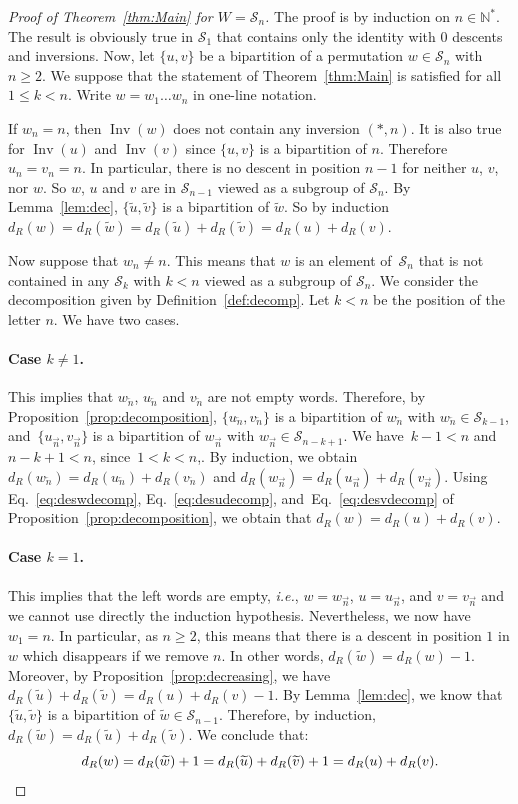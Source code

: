 \documentclass[Unicode]{cedram-alco}
\theoremstyle{definition}
\newcommand{\Sym}[1]{\mathcal{S}_{#1}}
\newcommand{\Symn}{\Sym{n}}
\DeclareMathOperator{\invs}{Inv}
\newcommand{\dec}[1]{\widetilde{#1}}
\newcommand{\R}{{\overrightarrow{n}}}
\newcommand{\LL}{{\overleftarrow{n}}}
\newcommand{\dd}{d_R}
\begin{document}
\begin{proof}[Proof of Theorem~\ref{thm:Main} for $W=\mathcal S_n$] The proof is  by induction on $n\in\mathbb N^*$. The result is obviously true in $\Sym{1}$ that contains only the identity with 0 descents and inversions. Now, let $\lbrace u, v \rbrace$ be a bipartition of a permutation $w \in \Symn$ with $n \geq 2$. We suppose that the statement of  Theorem~\ref{thm:Main} is satisfied for all $1 \leq k < n$. Write $w=w_1\dots w_n$ in one-line notation. 

If $w_n = n$, then $\invs(w)$ does not contain any inversion $(*, n)$. It is also true for $\invs(u)$ and $\invs(v)$ since $\{u,v\}$ is a bipartition of $n$. Therefore $u_n = v_n =n$. In particular, there is no descent in position $n-1$ for neither $u$, $v$, nor $w$. So $w$, $u$ and $v$ are in $\mathcal S_{n-1}$ viewed as a subgroup of $\Symn$.  By Lemma~\ref{lem:dec}, $\lbrace \dec{u}, \dec{v} \rbrace$ is a bipartition of $\dec{w}$. So by induction $\dd(w) = \dd(\dec{w}) = \dd(\dec{u}) + \dd(\dec{v}) = \dd(u) + \dd(v)$.

Now suppose that $w_n \neq n$. This means that $w$ is an element of~$\Symn$ that is not contained in any $\Sym{k}$ with $k < n$ viewed as a subgroup of $\Symn$. We consider the decomposition given by Definition~\ref{def:decomp}. Let $k<n$ be the position of the letter $n$. We have two cases.

\paragraph{Case $k \neq 1$.} This implies that $w_\LL$, $u_\LL$ and $v_\LL$ are not empty words. Therefore, by Proposition~\ref{prop:decomposition}, $\lbrace u_\LL, v_\LL \rbrace$ is a bipartition of $w_\LL$ with $w_\LL \in \Sym{k-1}$, and~$\lbrace u_\R, v_\R \rbrace$ is a bipartition of $w_\R$ with $w_\R \in \Sym{n-k+1}$. We have~$k-1 < n$ and  $n-k+1 <n$, since~$1<k < n$,. By induction, we obtain $\dd(w_\LL) = \dd(u_\LL) + \dd(v_\LL)$ and $\dd(w_\R) = \dd(u_\R) + \dd(v_\R)$. Using Eq.~\eqref{eq:deswdecomp}, Eq.~\eqref{eq:desudecomp}, and~Eq.~\eqref{eq:desvdecomp} of Proposition~\ref{prop:decomposition}, we obtain that $\dd(w) = \dd(u) + \dd(v)$.

\paragraph{Case $k=1$.} This implies that the left words are empty, \emph{i.e.}, $w = w_\R$, $u= u_\R$, and $v = v_\R$ and we cannot use directly the induction hypothesis. Nevertheless, we now have $w_1 = n$. In particular, as $n \geq 2$, this means that there is a descent in position $1$ in $w$ which disappears if we remove $n$. In other words, $\dd(\dec{w}) = \dd(w) - 1$.  Moreover, by Proposition~\ref{prop:decreasing}, we have $\dd(\dec{u}) + \dd(\dec{v}) = \dd(u) + \dd(v) -1$. By Lemma~\ref{lem:dec}, we know that $\lbrace \dec{u}, \dec{v} \rbrace$ is a bipartition of $\dec{w}\in\mathcal S_{n-1}$. Therefore, by induction,  $\dd(\dec{w}) = \dd(\dec{u}) + \dd(\dec{v})$. We conclude that:
\[\dd(w)=\dd(\dec{w}) +1=\dd(\dec{u}) + \dd(\dec{v}) +1= \dd(u) + \dd(v). \qedhere\]
\end{proof}
\end{document}
